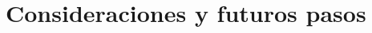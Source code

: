 \documentclass{subfiles}
\begin{document}
    \chapter{Consideraciones y futuros pasos}
    \label{chap:6}
\end{document}
